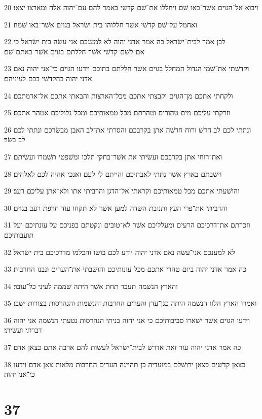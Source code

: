 \par 20 ויבוא אל־הגוים אשׁר־באו שׁם ויחללו את־שׁם קדשׁי באמר להם עם־יהוה אלה ומארצו יצאו׃
\par 21 ואחמל על־שׁם קדשׁי אשׁר חללוהו בית ישׂראל בגוים אשׁר־באו שׁמה׃
\par 22 לכן אמר לבית־ישׂראל כה אמר אדני יהוה לא למענכם אני עשׂה בית ישׂראל כי אם־לשׁם־קדשׁי אשׁר חללתם בגוים אשׁר־באתם שׁם׃
\par 23 וקדשׁתי את־שׁמי הגדול המחלל בגוים אשׁר חללתם בתוכם וידעו הגוים כי־אני יהוה נאם אדני יהוה בהקדשׁי בכם לעיניהם׃
\par 24 ולקחתי אתכם מן־הגוים וקבצתי אתכם מכל־הארצות והבאתי אתכם אל־אדמתכם׃
\par 25 וזרקתי עליכם מים טהורים וטהרתם מכל טמאותיכם ומכל־גלוליכם אטהר אתכם׃
\par 26 ונתתי לכם לב חדשׁ ורוח חדשׁה אתן בקרבכם והסרתי את־לב האבן מבשׂרכם ונתתי לכם לב בשׂר׃
\par 27 ואת־רוחי אתן בקרבכם ועשׂיתי את אשׁר־בחקי תלכו ומשׁפטי תשׁמרו ועשׂיתם׃
\par 28 וישׁבתם בארץ אשׁר נתתי לאבתיכם והייתם לי לעם ואנכי אהיה לכם לאלהים׃
\par 29 והושׁעתי אתכם מכל טמאותיכם וקראתי אל־הדגן והרביתי אתו ולא־אתן עליכם רעב׃
\par 30 והרביתי את־פרי העץ ותנובת השׂדה למען אשׁר לא תקחו עוד חרפת רעב בגוים׃
\par 31 וזכרתם את־דרכיכם הרעים ומעלליכם אשׁר לא־טובים ונקטתם בפניכם על עונתיכם ועל תועבותיכם׃
\par 32 לא למענכם אני־עשׂה נאם אדני יהוה יודע לכם בושׁו והכלמו מדרכיכם בית ישׂראל׃
\par 33 כה אמר אדני יהוה ביום טהרי אתכם מכל עונותיכם והושׁבתי את־הערים ונבנו החרבות׃
\par 34 והארץ הנשׁמה תעבד תחת אשׁר היתה שׁממה לעיני כל־עובר׃
\par 35 ואמרו הארץ הלזו הנשׁמה היתה כגן־עדן והערים החרבות והנשׁמות והנהרסות בצורות ישׁבו׃
\par 36 וידעו הגוים אשׁר ישׁארו סביבותיכם כי אני יהוה בניתי הנהרסות נטעתי הנשׁמה אני יהוה דברתי ועשׂיתי׃
\par 37 כה אמר אדני יהוה עוד זאת אדרשׁ לבית־ישׂראל לעשׂות להם ארבה אתם כצאן אדם׃
\par 38 כצאן קדשׁים כצאן ירושׁלם במועדיה כן תהיינה הערים החרבות מלאות צאן אדם וידעו כי־אני יהוה׃

\chapter{37}


